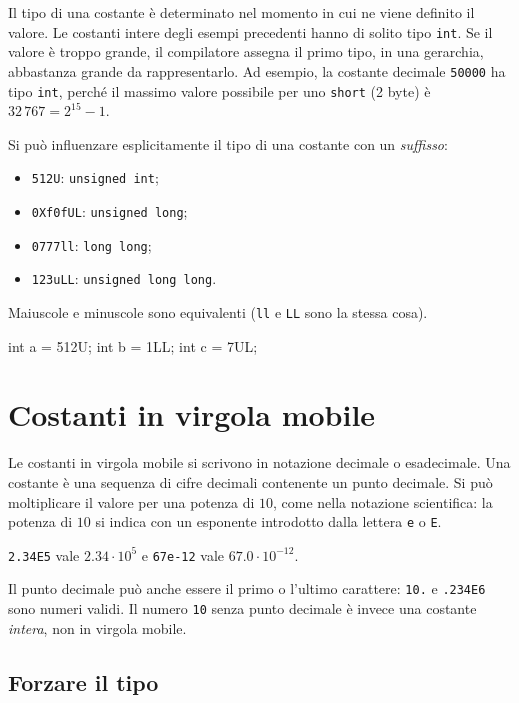 \documentclass[11pt,a4paper]{article}
\begin{document}
Il tipo di una costante è determinato nel momento in cui ne viene definito il valore. Le costanti intere degli esempi precedenti hanno di solito tipo \lstinline|int|. Se il valore è troppo grande, il compilatore assegna il primo tipo, in una gerarchia, abbastanza grande da rappresentarlo. Ad esempio, la costante decimale \lstinline|50000| ha tipo \lstinline|int|, perché il massimo valore possibile per uno \lstinline|short| (2 byte) è $32\,767 = 2^{15} - 1$.

Si può influenzare esplicitamente il tipo di una costante con un \emph{suffisso}:
\begin{itemize}
    \item \lstinline|512U|: \lstinline|unsigned int|;
    \item \lstinline|0Xf0fUL|: \lstinline|unsigned long|;
    \item \lstinline|0777ll|: \lstinline|long long|;
    \item \lstinline|123uLL|: \lstinline|unsigned long long|.
\end{itemize}
Maiuscole e minuscole sono equivalenti (\lstinline|ll| e \lstinline|LL| sono la stessa cosa).

\begin{codice}
int a = 512U;
int b = 1LL;
int c = 7UL;
\end{codice}

\section{Costanti in virgola mobile}

Le costanti in virgola mobile si scrivono in notazione decimale o esadecimale. Una costante è una sequenza di cifre decimali contenente un punto decimale. Si può moltiplicare il valore per una potenza di $10$, come nella notazione scientifica: la potenza di $10$ si indica con un esponente introdotto dalla lettera \lstinline|e| o \lstinline|E|.

\begin{esempio}
\lstinline|2.34E5| vale $2.34 \cdot 10^5$ e \lstinline|67e-12| vale $67.0 \cdot 10^{-12}$.
\end{esempio}

Il punto decimale può anche essere il primo o l'ultimo carattere: \lstinline|10.| e \lstinline|.234E6| sono numeri validi. Il numero \lstinline|10| senza punto decimale è invece una costante \emph{intera}, non in virgola mobile.

\subsection{Forzare il tipo}
\end{document}
